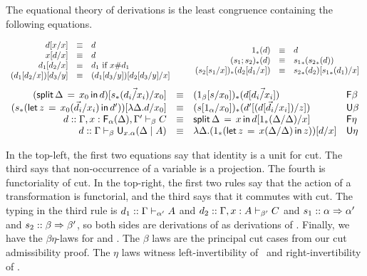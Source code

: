 The equational theory of derivations is the least congruence containing
the following equations.  
\begin{small}
\[
\begin{array}{rcll} 
\Cut{\D}{\Ident{x}}{x} & \deq & \D \\
\Cut{\Ident{x}}{\D}{x} & \deq & \D \\
\Cut{\D_1}{\D_2}{x} & \deq & \D_1 \text{ if $x \# \D_1$}\\
\Cut{(\Cut{\D_1}{\D_2}{x})}{\D_3}{y} & \deq & \Cut{(\Cut{\D_1}{\D_3}{y})}{\Cut{\D_2}{\D_3}{y}}{x}\\
\end{array}
\qquad
\begin{array}{rcll}
\Trd{1}{\D} & \deq & \D\\
\Trd{(s_1;s_2)}{\D} & \deq & \Trd{{s_1}}{\Trd{{s_2}}{\D}} \\
\Trd{(\subst{s_2}{s_1}{x})}{\Cut{\D_2}{\D_1}{x}} & \deq & \Cut{\Trd{{s_2}}{\D_2}}{\Trd{{s_1}}{\D_1}}{x} \\
\end{array}
\]
\[
\begin{array}{rcll}
\Cut{(\FLd{x_0}{\Delta}{\D})}{\FRd{}{s}{\vec{\D_i/x_i}}}{x_0} & \deq & \Trd{(1_\beta[s/x_0])}{\D[\vec{\D_i/x_i}]} & \dsd{F\beta} \\
\Cut{(\ULd{x_0}{}{s}{\vec{\D_i}/x_i}{z}{\D'})}{\URd{\Delta}{\D}}{x_0} & \deq & \Trd{(s[1_{\alpha}/{x_0}])}{\Cut{\D'}{(\D[{\vec{d_i}/x_i}])}{z}} & \dsd{U\beta} \\
\D :: \seq{\Gamma,x:\F{\alpha}{\Delta},\Gamma'}{\beta}{C} & \deq &
\FLd{x}{\Delta}{\Cut{\D}{\FRd{}{1}{\Delta/\Delta}}{x}} & \dsd{F\eta}\\
\D :: \seq{\Gamma}{\beta}{\U{x.\alpha}{\Delta}{A}} & \deq & \URd{\Delta}{\Cut{(\ULd{x}{}{1}{\Delta/\Delta}{z}{z})}{\D}{x}} & \dsd{U\eta}\\
\end{array}
\]
\end{small}

In the top-left, the first two equations say that identity is a unit for
cut.  The third says that non-occurrence of a variable is a projection.
The fourth is functoriality of cut.  In the top-right, the first two
rules say that the action of a transformation is functorial, and the
third says that it commutes with cut.  The typing in the third rule is
$\D_1 :: \seq{\Gamma}{\alpha'}{A}$ and $\D_2 ::
\seq{\Gamma,x:A}{\beta'}{C}$ and $s_1 :: \alpha \spr \alpha'$ and $s_2
:: \beta \spr \beta'$, so both sides are derivations of as derivations
of .  Finally, we have the
$\beta\eta$-laws for  and .  The $\beta$ laws are the
principal cut cases from our cut admissibility proof.  The $\eta$ laws
witness left-invertibility of \Fsymb\, and right-invertibility of
\Usymb.


